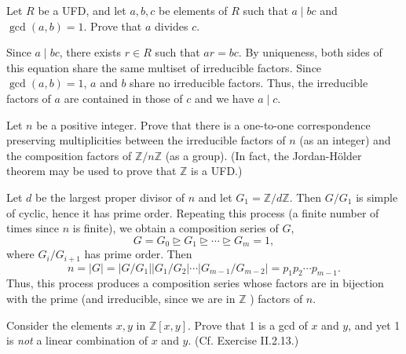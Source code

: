 \documentclass[../../master.tex]{subfiles}
\begin{document}
    \begin{problem}
        Let $R$ be a UFD, and let $a, b, c$ be elements of $R$ such that $a \mid
        bc$ and $\gcd(a, b) = 1$. Prove that $a$ divides $c$.
    \end{problem}

    \begin{solution}
        Since $a \mid bc$, there exists $r \in R$ such that $ar = bc$. By
        uniqueness, both sides of this equation share the same multiset of
        irreducible factors. Since $\gcd(a, b) = 1$, $a$ and $b$ share no
        irreducible factors. Thus, the irreducible factors of $a$ are contained
        in those of $c$ and we have $a \mid c$.
    \end{solution}

    \begin{problem}
        Let $n$ be a positive integer. Prove that there is a one-to-one
        correspondence preserving multiplicities between the irreducible factors
        of $n$ (as an integer) and the composition factors of $\mathbb{Z} /
        n\mathbb{Z}$ (as a group). (In fact, the Jordan-H\"{o}lder theorem may
        be used to prove that $\mathbb{Z}$ is a UFD.)
    \end{problem}

    \begin{solution}
        Let $d$ be the largest proper divisor of $n$ and let $G_1 = \mathbb{Z} /
        d \mathbb{Z}$. Then $G / G_1$ is simple of cyclic, hence it has prime
        order. Repeating this process (a finite number of times since $n$ is
        finite), we obtain a composition series of $G$,
        \[
        G = G_0 \trianglerighteq G_1 \trianglerighteq \cdots \trianglerighteq
        G_m = 1,
        \] 
        where $G_i / G_{i+1}$ has prime order. Then 
        \[
            n = |G| = |G / G_1| |G_1 / G_2| \cdots |G_{m-1} / G_{m-2}| = p_1 p_2
            \cdots p_{m-1}.
        \] 
        Thus, this process produces a composition series whose factors are in
        bijection with the prime (and irreducible, since we are in $\mathbb{Z}$
        ) factors of $n$.
    \end{solution}

    \begin{problem}
        Consider the elements $x, y$ in $\mathbb{Z}[x, y]$. Prove that 1 is a
        gcd of $x$ and $y$, and yet 1 is \textit{not} a linear combination of
        $x$ and $y$. (Cf. Exercise II.2.13.)
    \end{problem}
\end{document}
